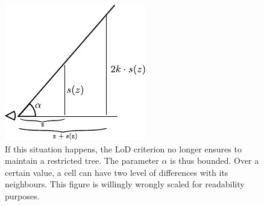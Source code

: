 \documentclass[twocolumn]{cgi2015_latex/svjour3}          %
\begin{document}
\begin{figure} [h]
\centering
\includegraphics[height=0.2\textheight]{proof1}
\caption{If this situation happens, the LoD criterion no longer ensures to maintain a restricted tree.
The parameter $\alpha$ is thus bounded. Over a certain value, a cell can have two level of differences with its neighbours.
This figure is willingly wrongly scaled for readability purposes.}
\label{proof_constraint}
\end{figure}
\end{document}
